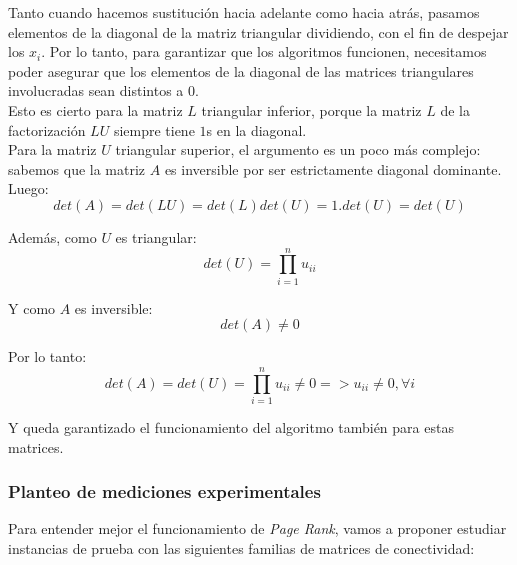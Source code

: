 				Tanto cuando hacemos sustitución hacia adelante como hacia atrás, pasamos elementos de la diagonal de la matriz triangular dividiendo, con el fin de despejar los $x_i$. Por lo tanto, para garantizar que los algoritmos funcionen, necesitamos poder asegurar que los elementos de la diagonal de las matrices triangulares involucradas sean distintos a $0$. \\

				Esto es cierto para la matriz $L$ triangular inferior, porque la matriz $L$ de la factorización $LU$ siempre tiene $1$s en la diagonal. \\

				Para la matriz $U$ triangular superior, el argumento es un poco más complejo: sabemos que la matriz $A$ es inversible por ser estrictamente diagonal dominante. Luego: \\ %

				\begin{equation}
					det(A) = det(LU) = det(L)det(U) = 1.det(U) = det(U)
				\end{equation}

				Además, como $U$ es triangular: \\

				\begin{equation}
					det(U) = \prod_{i=1}^{n} u_{ii}
				\end{equation}

				Y como $A$ es inversible: \\

				\begin{equation}
					det(A) \neq 0
				\end{equation}

				Por lo tanto: \\

				\begin{equation}
					det(A) = det(U) = \prod_{i=1}^{n} u_{ii} \neq 0 => u_{ii} \neq 0, \forall i
				\end{equation}

				Y queda garantizado el funcionamiento del algoritmo también para estas matrices. \\

		\subsubsection{Planteo de mediciones experimentales}

			Para entender mejor el funcionamiento de \textit{Page Rank}, vamos a proponer estudiar instancias de prueba con las siguientes familias de matrices de conectividad:\\

